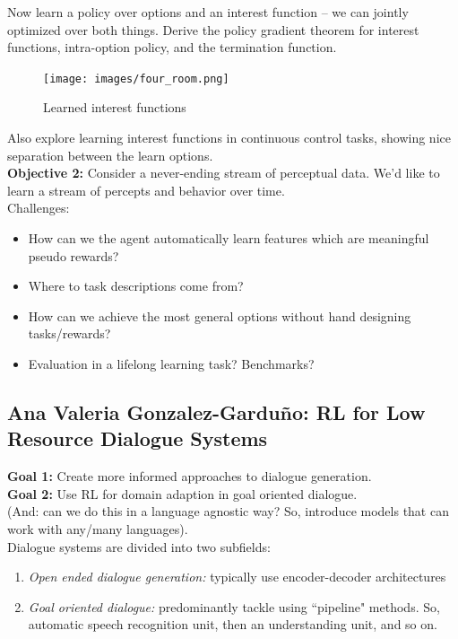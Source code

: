 Now learn a policy over options and an interest function -- we can jointly optimized over both things. Derive the policy gradient theorem for interest functions, intra-option policy, and the termination function. \\

\begin{figure}[h!]
    \centering
    \texttt{[image: images/four\_room.png]}
    \caption{Learned interest functions}
    \label{fig:opt_four}
\end{figure}

Also explore learning interest functions in continuous control tasks, showing nice separation between the learn options. \\

{\bf Objective 2:} Consider a never-ending stream of perceptual data. We'd like to learn a stream of percepts and behavior over time. \\

Challenges:
\begin{itemize}
    \item How can we the agent automatically learn features which are meaningful pseudo rewards?
    \item Where to task descriptions come from?
    \item How can we achieve the most general options without hand designing tasks/rewards?
    \item Evaluation in a lifelong learning task? Benchmarks?
\end{itemize}


\spacerule
\subsection{Ana Valeria Gonzalez-Garduño: RL for Low Resource Dialogue Systems}

{\bf Goal 1:} Create more informed approaches to dialogue generation. \\

{\bf Goal 2:} Use RL for domain adaption in goal oriented dialogue. \\

(And: can we do this in a language agnostic way? So, introduce models that can work with any/many languages). \\

Dialogue systems are divided into two subfields:
\begin{enumerate}
    \item {\it Open ended dialogue generation:} typically use encoder-decoder architectures
    \item {\it Goal oriented dialogue:} predominantly tackle using ``pipeline" methods. So, automatic speech recognition unit, then an understanding unit, and so on.
\end{enumerate}

